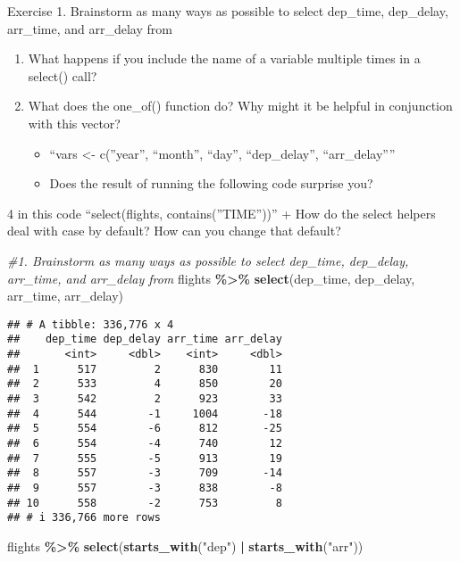 \documentclass[
]{article}
\newenvironment{Shaded}{\begin{snugshade}}{\end{snugshade}}
\newcommand{\CommentTok}[1]{\textcolor[rgb]{0.56,0.35,0.01}{\textit{#1}}}
\newcommand{\FunctionTok}[1]{\textcolor[rgb]{0.13,0.29,0.53}{\textbf{#1}}}
\newcommand{\NormalTok}[1]{#1}
\newcommand{\SpecialCharTok}[1]{\textcolor[rgb]{0.81,0.36,0.00}{\textbf{#1}}}
\newcommand{\StringTok}[1]{\textcolor[rgb]{0.31,0.60,0.02}{#1}}
\providecommand{\tightlist}{%
  \setlength{\itemsep}{0pt}\setlength{\parskip}{0pt}}
\begin{document}
Exercise 1. Brainstorm as many ways as possible to select dep\_time,
dep\_delay, arr\_time, and arr\_delay from

\begin{enumerate}
\def\labelenumi{\arabic{enumi}.}
\setcounter{enumi}{1}
\item
  What happens if you include the name of a variable multiple times in a
  select() call?
\item
  What does the one\_of() function do? Why might it be helpful in
  conjunction with this vector?

  \begin{itemize}
  \tightlist
  \item
    ``vars \textless- c(''year'', ``month'', ``day'', ``dep\_delay'',
    ``arr\_delay''''
  \item
    Does the result of running the following code surprise you?
  \end{itemize}
\end{enumerate}

4 in this code ``select(flights, contains(''TIME''))'' + How do the
select helpers deal with case by default? How can you change that
default?

\begin{Shaded}
\begin{Highlighting}[]
\CommentTok{\#1. Brainstorm as many ways as possible to select dep\_time, dep\_delay, arr\_time, and arr\_delay from}
\NormalTok{flights }\SpecialCharTok{\%\textgreater{}\%} \FunctionTok{select}\NormalTok{(dep\_time, dep\_delay, arr\_time, arr\_delay)}
\end{Highlighting}
\end{Shaded}

\begin{verbatim}
## # A tibble: 336,776 x 4
##    dep_time dep_delay arr_time arr_delay
##       <int>     <dbl>    <int>     <dbl>
##  1      517         2      830        11
##  2      533         4      850        20
##  3      542         2      923        33
##  4      544        -1     1004       -18
##  5      554        -6      812       -25
##  6      554        -4      740        12
##  7      555        -5      913        19
##  8      557        -3      709       -14
##  9      557        -3      838        -8
## 10      558        -2      753         8
## # i 336,766 more rows
\end{verbatim}

\begin{Shaded}
\begin{Highlighting}[]
\NormalTok{flights }\SpecialCharTok{\%\textgreater{}\%} \FunctionTok{select}\NormalTok{(}\FunctionTok{starts\_with}\NormalTok{(}\StringTok{"dep"}\NormalTok{) }\SpecialCharTok{|} \FunctionTok{starts\_with}\NormalTok{(}\StringTok{"arr"}\NormalTok{))}
\end{Highlighting}
\end{Shaded}
\end{document}
